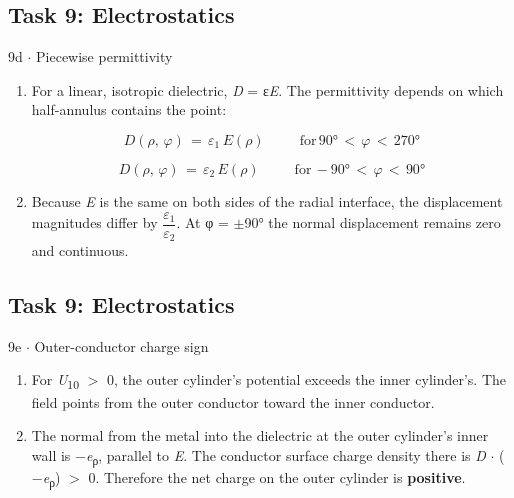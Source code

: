 \documentclass[11pt]{article}
\begin{document}
\begin{keepsection}\subsection{Task 9: Electrostatics}

\begin{workedbox}{9d \ensuremath{\cdot} Piecewise permittivity}
\begin{enumerate}
\item {}
For a linear, isotropic dielectric, \textit{D} = ε\textit{E}. The permittivity depends on which half-annulus contains the point:

\begin{equation*}{D}(ρ,\, φ)\, =\, ε_{1}\, {E}(ρ)\, \quad \, \quad \, \text{for}\, 90°\, <\, φ\, <\, 270°\end{equation*}

\begin{equation*}{D}(ρ,\, φ)\, =\, ε_{2}\, {E}(ρ)\, \quad \, \quad \, \text{for}\, -90°\, <\, φ\, <\, 90°\end{equation*}
\item Because \textit{E} is the same on both sides of the radial interface, the displacement magnitudes differ by {\small\ensuremath{\dfrac{ε_{1}}{ε_{2}}}}. At φ = \ensuremath{\pm}90° the normal displacement remains zero and continuous.
\end{enumerate}
\end{workedbox}

\end{keepsection}
\begin{keepsection}\subsection{Task 9: Electrostatics}

\begin{workedbox}{9e \ensuremath{\cdot} Outer-conductor charge sign}
\begin{enumerate}
\item For \textit{U}\textsubscript{10} \ensuremath{>} 0, the outer cylinder’s potential exceeds the inner cylinder’s. The field points from the outer conductor toward the inner conductor.
\item The normal from the metal into the dielectric at the outer cylinder’s inner wall is \ensuremath{-}\textit{e}\textsubscript{ρ}, parallel to \textit{E}. The conductor surface charge density there is \textit{D} \ensuremath{\cdot} (\ensuremath{-}\textit{e}\textsubscript{ρ}) \ensuremath{>} 0. Therefore the net charge on the outer cylinder is \textbf{positive}.
\end{enumerate}
\end{workedbox}

\end{keepsection}
\end{document}
